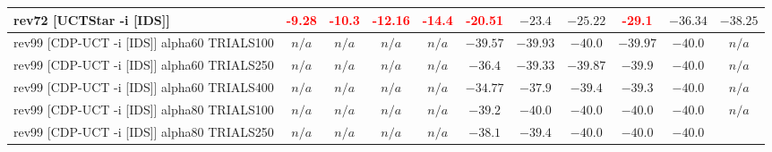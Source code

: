 \documentclass{article}
\begin{document}
\begin{tabular}{|l|r@{$\pm$}rr@{$\pm$}rr@{$\pm$}rr@{$\pm$}rr@{$\pm$}rr@{$\pm$}rr@{$\pm$}rr@{$\pm$}rr@{$\pm$}rr@{$\pm$}r|}
\\
rev72 [UCTStar -i [IDS]]
& \multicolumn{2}{c}{\textbf{\textcolor{red}{-9.28}}}
& \multicolumn{2}{c}{\textbf{\textcolor{red}{-10.3}}}
& \multicolumn{2}{c}{\textbf{\textcolor{red}{-12.16}}}
& \multicolumn{2}{c}{\textbf{\textcolor{red}{-14.4}}}
& \multicolumn{2}{c}{\textbf{\textcolor{red}{-20.51}}}
& \multicolumn{2}{c}{$-23.4$}
& \multicolumn{2}{c}{$-25.22$}
& \multicolumn{2}{c}{\textbf{\textcolor{red}{-29.1}}}
& \multicolumn{2}{c}{$-36.34$}
& \multicolumn{2}{c|}{$-38.25$}
\\
\hline
rev99 [CDP-UCT -i [IDS]] alpha60 TRIALS100
& \multicolumn{2}{c}{\textbf{$n/a$}}
& \multicolumn{2}{c}{\textbf{$n/a$}}
& \multicolumn{2}{c}{\textbf{$n/a$}}
& \multicolumn{2}{c}{\textbf{$n/a$}}
& \multicolumn{2}{c}{$-39.57$}
& \multicolumn{2}{c}{$-39.93$}
& \multicolumn{2}{c}{$-40.0$}
& \multicolumn{2}{c}{$-39.97$}
& \multicolumn{2}{c}{$-40.0$}
& \multicolumn{2}{c|}{\textbf{$n/a$}}
\\
rev99 [CDP-UCT -i [IDS]] alpha60 TRIALS250
& \multicolumn{2}{c}{\textbf{$n/a$}}
& \multicolumn{2}{c}{\textbf{$n/a$}}
& \multicolumn{2}{c}{\textbf{$n/a$}}
& \multicolumn{2}{c}{\textbf{$n/a$}}
& \multicolumn{2}{c}{$-36.4$}
& \multicolumn{2}{c}{$-39.33$}
& \multicolumn{2}{c}{$-39.87$}
& \multicolumn{2}{c}{$-39.9$}
& \multicolumn{2}{c}{$-40.0$}
& \multicolumn{2}{c|}{\textbf{$n/a$}}
\\
rev99 [CDP-UCT -i [IDS]] alpha60 TRIALS400
& \multicolumn{2}{c}{\textbf{$n/a$}}
& \multicolumn{2}{c}{\textbf{$n/a$}}
& \multicolumn{2}{c}{\textbf{$n/a$}}
& \multicolumn{2}{c}{\textbf{$n/a$}}
& \multicolumn{2}{c}{$-34.77$}
& \multicolumn{2}{c}{$-37.9$}
& \multicolumn{2}{c}{$-39.4$}
& \multicolumn{2}{c}{$-39.3$}
& \multicolumn{2}{c}{$-40.0$}
& \multicolumn{2}{c|}{\textbf{$n/a$}}
\\
rev99 [CDP-UCT -i [IDS]] alpha80 TRIALS100
& \multicolumn{2}{c}{\textbf{$n/a$}}
& \multicolumn{2}{c}{\textbf{$n/a$}}
& \multicolumn{2}{c}{\textbf{$n/a$}}
& \multicolumn{2}{c}{\textbf{$n/a$}}
& \multicolumn{2}{c}{$-39.2$}
& \multicolumn{2}{c}{$-40.0$}
& \multicolumn{2}{c}{$-40.0$}
& \multicolumn{2}{c}{$-40.0$}
& \multicolumn{2}{c}{$-40.0$}
& \multicolumn{2}{c|}{\textbf{$n/a$}}
\\
rev99 [CDP-UCT -i [IDS]] alpha80 TRIALS250
& \multicolumn{2}{c}{\textbf{$n/a$}}
& \multicolumn{2}{c}{\textbf{$n/a$}}
& \multicolumn{2}{c}{\textbf{$n/a$}}
& \multicolumn{2}{c}{\textbf{$n/a$}}
& \multicolumn{2}{c}{$-38.1$}
& \multicolumn{2}{c}{$-39.4$}
& \multicolumn{2}{c}{$-40.0$}
& \multicolumn{2}{c}{$-40.0$}
& \multicolumn{2}{c}{$-40.0$}

\end{tabular}
\end{document}
